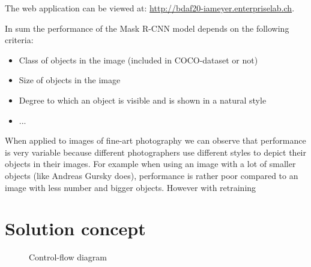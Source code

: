 \documentclass[a4paper,10pt,hidelinks]{scrartcl}
\begin{document}
\noindent
The web application can be viewed at: \url{http://bdaf20-iameyer.enterpriselab.ch}.

\noindent
In sum the performance of the Mask R-CNN model depends on the following criteria:

\begin{itemize}
	\item Class of objects in the image (included in COCO-dataset or not)
	\item Size of objects in the image
	\item Degree to which an object is visible and is shown in a natural style
	\item ...
\end{itemize}

\noindent
When applied to images of fine-art photography we can observe that performance is very variable because different photographers use different styles to depict their objects in their images. For example when using an image with a lot of smaller objects (like Andreas Gursky does), performance is rather poor compared to an image with less number and bigger objects. However with retraining %

\section{\fontsize{14}{16}\selectfont Solution concept}

\begin{figure}
	\caption{\label{fig:control-flow} Control-flow diagram}
\end{figure}
\end{document}
